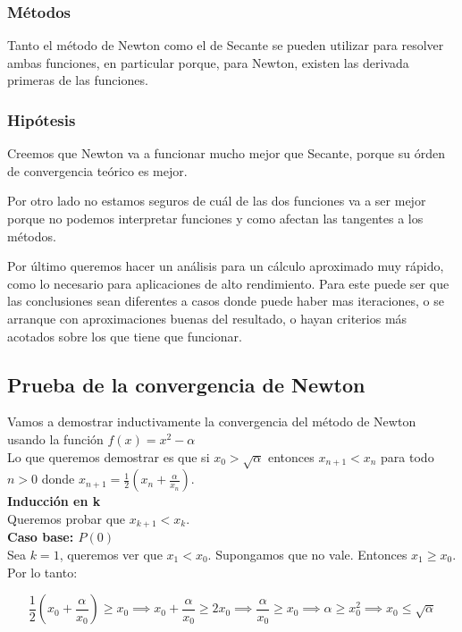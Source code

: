 \subsubsection{Métodos}
Tanto el método de Newton como el de Secante se pueden utilizar para resolver ambas funciones,
en particular porque, para Newton, existen las derivada primeras de las funciones.

\subsubsection{Hipótesis}
Creemos que Newton va a funcionar mucho mejor que Secante, porque su órden de
convergencia teórico es mejor.

Por otro lado no estamos seguros de cuál de las dos funciones va a ser mejor
porque no podemos interpretar funciones y como afectan las tangentes a los
métodos.

Por último queremos hacer un análisis para un cálculo aproximado muy rápido,
como lo necesario para aplicaciones de alto rendimiento. Para este puede ser que las conclusiones sean
diferentes a casos donde puede haber mas iteraciones, o se arranque con aproximaciones buenas del resultado,
o hayan criterios más acotados sobre los que tiene que funcionar.

\subsection{Prueba de la convergencia de Newton}
Vamos a demostrar inductivamente la convergencia del método de Newton usando la función $\displaystyle f(x) = x^2 - \alpha$\\

Lo que queremos demostrar es que si $x_0 > \sqrt{\alpha}$ entonces $x_{n + 1} < x_n$ para todo $n > 0$ donde $\displaystyle x_{n + 1} = \frac{1}{2}(x_n + \frac{\alpha}{x_n})$.\\

{\large \bf Inducción en k}\\
Queremos probar que $x_{k + 1} < x_k$.\\

{\bf Caso base: $P(0)$}\\
Sea $k = 1$, queremos ver que $x_1 < x_0$. Supongamos que no vale. Entonces $x_1 \ge x_0$. Por lo tanto:

\begin{displaymath}
    \frac{1}{2}(x_0 + \frac{\alpha}{x_0}) \ge x_0 \implies x_0 + \frac{\alpha}{x_0} \ge 2x_0 \implies \frac{\alpha}{x_0} \ge x_0 \implies \alpha \ge x_0^2 \implies x_0 \le \sqrt{\alpha}
\end{displaymath}

